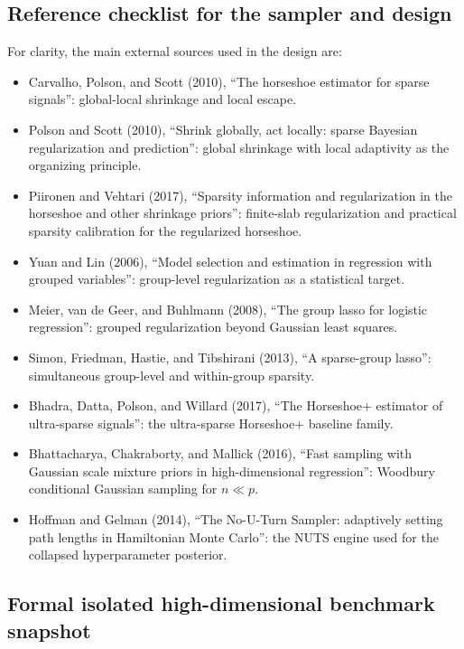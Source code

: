 \documentclass[11pt]{article}
\begin{document}
\subsection{Reference checklist for the sampler and design}

For clarity, the main external sources used in the design are:
\begin{itemize}[leftmargin=*]
  \item Carvalho, Polson, and Scott (2010), ``The horseshoe estimator for
  sparse signals'': global-local shrinkage and local escape.
  \item Polson and Scott (2010), ``Shrink globally, act locally: sparse
  Bayesian regularization and prediction'': global shrinkage with local
  adaptivity as the organizing principle.
  \item Piironen and Vehtari (2017), ``Sparsity information and regularization
  in the horseshoe and other shrinkage priors'': finite-slab regularization and
  practical sparsity calibration for the regularized horseshoe.
  \item Yuan and Lin (2006), ``Model selection and estimation in regression
  with grouped variables'': group-level regularization as a statistical target.
  \item Meier, van de Geer, and Buhlmann (2008), ``The group lasso for logistic
  regression'': grouped regularization beyond Gaussian least squares.
  \item Simon, Friedman, Hastie, and Tibshirani (2013), ``A sparse-group
  lasso'': simultaneous group-level and within-group sparsity.
  \item Bhadra, Datta, Polson, and Willard (2017), ``The Horseshoe+ estimator
  of ultra-sparse signals'': the ultra-sparse Horseshoe+ baseline family.
  \item Bhattacharya, Chakraborty, and Mallick (2016), ``Fast sampling with
  Gaussian scale mixture priors in high-dimensional regression'': Woodbury
  conditional Gaussian sampling for \(n \ll p\).
  \item Hoffman and Gelman (2014), ``The No-U-Turn Sampler: adaptively setting
  path lengths in Hamiltonian Monte Carlo'': the NUTS engine used for the
  collapsed hyperparameter posterior.
\end{itemize}

\subsection{Formal isolated high-dimensional benchmark snapshot}
\end{document}
